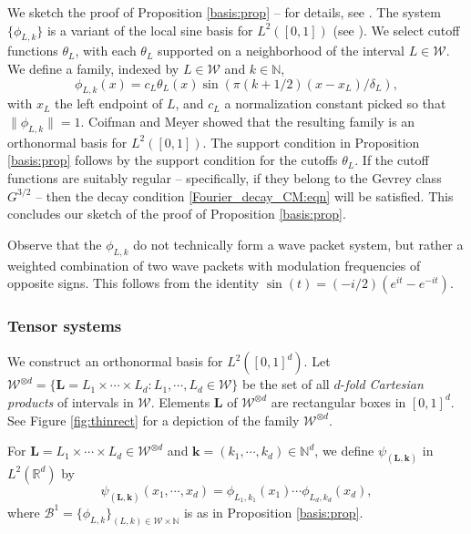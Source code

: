 \documentclass[conference]{IEEEtran}
\def\R{\mathbb{R}}
\numberwithin{equation}{section}
\newcommand{\N}{\mathbb N}
\newcommand{\cW}{\mathcal W}
\newcommand{\cB}{\mathcal B}
\newcommand{\bL}{\mathbf L}
\newcommand{\bk}{\mathbf k}
\def\R{\mathbb{R}}
\begin{document}
We sketch the proof of Proposition \ref{basis:prop} -- for details, see \cite{israelmayeli2023acha}.
The system $\{\phi_{L,k}\}$ is a variant of the local sine basis for $L^2([0,1])$ (see \cite{CM,Weiss93}).  
We select cutoff functions $\theta_L$, with each $\theta_L$ supported on a neighborhood of the interval $L \in \cW$. We define a 
family, indexed by $L \in \cW$ and $k \in \N$,
\[
\phi_{L,k}(x) = c_L \theta_L(x) \sin(\pi(k+1/2)(x-x_L)/\delta_L),
\]
with $x_L$ the left endpoint of $L$, and $c_L$ a normalization constant picked so that $\| \phi_{L,k} \|  = 1$.
Coifman and  Meyer showed that the resulting family is an orthonormal basis for $L^2([0,1])$. The support condition in Proposition \ref{basis:prop} follows by the support condition for the cutoffs $\theta_L$. 
If the cutoff functions are suitably regular -- specifically, if they belong to the Gevrey class $G^{3/2}$ --  then the decay condition \eqref{Fourier_decay_CM:eqn} will be satisfied. This concludes our sketch of the proof of Proposition \ref{basis:prop}.


Observe that the $\phi_{L,k}$ do not technically form a wave packet system, but rather   a weighted combination of two wave packets with modulation frequencies of opposite signs. 
This follows from the identity $\sin(t) = (-i/2)(e^{it} - e^{-it})$. 


\subsubsection{Tensor systems}
%







We construct an orthonormal basis for $L^2([0,1]^d)$. 
Let $\cW^{\otimes d} = \{ \bL = L_1 \times \cdots \times L_d : L_1,\cdots,L_d \in \cW\}$ be the set of all $d$-{\it fold Cartesian products} of intervals in $\cW$. Elements $\bL$ of $\cW^{\otimes d}$ are rectangular boxes in $[0,1]^d$. See Figure \ref{fig:thinrect} for a depiction of the family $\cW^{\otimes d}$.


For $\bL = L_1 \times \cdots \times L_d \in \cW^{\otimes d}$ and $\bk = (k_1,\cdots,k_d) \in \N^d$, we define $\psi_{(\bL,\bk)}$ in $L^2(\R^d)$ by
\[
\psi_{(\bL,\bk)}(x_1,\cdots,x_d) = \phi_{L_1, k_1}(x_1)\cdots\phi_{L_d,k_d}(x_d),
\]
where $\cB^1 = \{\phi_{L, k}\}_{(L,k) \in \cW \times \N}$ is as in Proposition \ref{basis:prop}.
\end{document}
